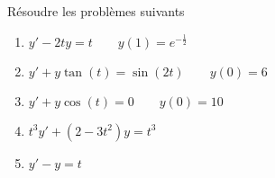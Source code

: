 
\begin{exercice}[\minsyndical]\label{exoTD6b-0004}

Résoudre les problèmes suivants
\begin{enumerate}
\item $ y' - 2ty = t \qquad y(1) = e^{- \frac{1}{2}} $
\item $ y' + y \tan(t) = \sin(2t) \qquad y(0) = 6 $
\item $ y' + y \cos(t) = 0 \qquad y(0) = 10 $
\item\coolexo $ t^3 y' + (2 - 3t^2)y = t^3 $
\item $  y' - y = t $
\end{enumerate}

\end{exercice}
